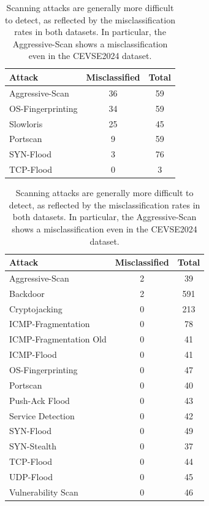\begin{table}[H]
\centering
\begin{minipage}{0.48\textwidth}
\centering
\caption{Misclassified attacks, Self-collected Dataset}
\begin{tabular}{lcc}
\hline
Attack & Misclassified & Total \\
\hline
Aggressive-Scan      & 36 & 59 \\
OS-Fingerprinting    & 34 & 59 \\
Slowloris            & 25 & 45 \\
Portscan             &  9 & 59 \\
SYN-Flood            &  3 & 76 \\
TCP-Flood            &  0 &  3 \\
\hline
\end{tabular}
\end{minipage}\hfill
\begin{minipage}{0.48\textwidth}
\centering
\caption{Misclassified attacks, CEVSE2024 Dataset}
\begin{tabular}{lcc}
\hline
Attack & Misclassified & Total \\
\hline
Aggressive-Scan          & 2  & 39  \\
Backdoor                 & 2  & 591 \\
Cryptojacking            & 0  & 213 \\
ICMP-Fragmentation       & 0  & 78  \\
ICMP-Fragmentation Old   & 0  & 41  \\
ICMP-Flood               & 0  & 41  \\
OS-Fingerprinting        & 0  & 47  \\
Portscan                & 0  & 40  \\
Push-Ack Flood           & 0  & 43  \\
Service Detection        & 0  & 42  \\
SYN-Flood                & 0  & 49  \\
SYN-Stealth              & 0  & 37  \\
TCP-Flood                & 0  & 44  \\
UDP-Flood                & 0  & 45  \\
Vulnerability Scan       & 0  & 46  \\
\hline
\end{tabular}
\end{minipage}
\caption*{Scanning attacks are generally more difficult to detect, as reflected by the misclassification rates in both datasets. In particular, the Aggressive-Scan shows a misclassification even in the CEVSE2024 dataset.}
\end{table}
